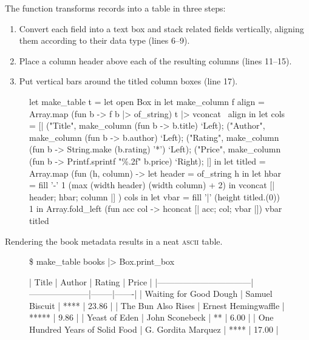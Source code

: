 \documentclass{article}
\begin{document}
The \href{#ref-make-table}{} function transforms records into a table in three steps:
\begin{enumerate}
\item Convert each field into a text box and stack related fields vertically, aligning them according to their data type (lines 6--9).
\item Place a column header above each of the resulting columns (lines 11--15).
\item Put vertical bars around the titled column boxes (line 17).
\end{enumerate}

\begin{figure}
\begin{code}
let make_table t =\label{ref-make-table}
    let open Box in
    let make_column f align =
        Array.map (fun b -> f b |> of_string) t |> vconcat ~align in
    let cols = [|
        ("Title",  make_column (fun b -> b.title) `Left);
        ("Author", make_column (fun b -> b.author) `Left);
        ("Rating", make_column (fun b -> String.make (b.rating) '*') `Left);
        ("Price",  make_column (fun b -> Printf.sprintf "\%.2f" b.price) `Right);
    |] in
    let titled = Array.map (fun (h, column) ->
        let header = of_string h in
        let hbar = fill '-' 1 (max (width header) (width column) + 2)
        in vconcat [| header; hbar; column |]
    ) cols in
    let vbar = fill '|' (height titled.(0)) 1 in
    Array.fold_left (fun acc col -> hconcat [| acc; col; vbar |]) vbar titled
\end{code}
\end{figure}

Rendering the book metadata results in a neat \textsc{ascii} table.

\begin{figure}
\begin{code}[text]
\$ make_table books |> Box.print_box

|              Title              |       Author        | Rating | Price |
|---------------------------------|---------------------|--------|-------|
| Waiting for Good Dough          | Samuel Biscuit      | ****   | 23.86 |
| The Bun Also Rises              | Ernest Hemingwaffle | *****  |  9.86 |
| Yeast of Eden                   | John Sconebeck      | **     |  6.00 |
| One Hundred Years of Solid Food | G. Gordita Marquez  | ****   | 17.00 |
\end{code}
\end{figure}
\end{document}
